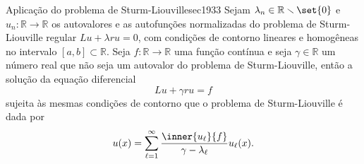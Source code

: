 \begin{lemma}{Aplicação do problema de Sturm-Liouville}{sec1933}
    Sejam \(\lambda_n \in \mathbb{R} \smallsetminus\set{0}\) e \(u_n : \mathbb{R} \to \mathbb{R}\) os autovalores e as autofunções normalizadas do problema de Sturm-Liouville regular \(Lu + \lambda ru = 0\), com condições de contorno lineares e homogêneas no intervalo \([a,b]\subset \mathbb{R}\). Seja \(f : \mathbb{R} \to \mathbb{R}\) uma função contínua e seja \(\gamma \in \mathbb{R}\) um número real que não seja um autovalor do problema de Sturm-Liouville, então a solução da equação diferencial
    \begin{equation*}
        Lu + \gamma ru = f
    \end{equation*}
    sujeita às mesmas condições de contorno que o problema de Sturm-Liouville é dada por
    \begin{equation*}
        u(x) = \sum_{\ell = 1}^\infty \frac{\inner{u_\ell}{f}}{\gamma - \lambda_\ell}u_\ell(x).
    \end{equation*}
\end{lemma}
